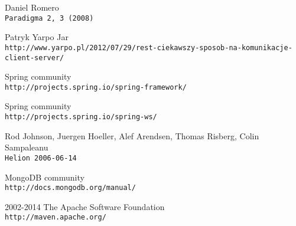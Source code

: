 \documentclass[11pt]{aghdpl}
\begin{document}
\begin{thebibliography}{1}
Daniel Romero
\newblock \\\texttt{Paradigma 2, 3 (2008)}

Patryk Yarpo Jar
\newblock \\\texttt{http://www.yarpo.pl/2012/07/29/rest-ciekawszy-sposob-na-komunikacje-client-server/}

Spring community
\newblock \\\texttt{http://projects.spring.io/spring-framework/}

Spring community
\newblock \\\texttt{http://projects.spring.io/spring-ws/}

Rod Johnson, Juergen Hoeller, Alef Arendsen, Thomas Risberg, Colin Sampaleanu
\newblock \\\texttt{Helion 2006-06-14}

MongoDB community
\newblock \\\texttt{http://docs.mongodb.org/manual/}

2002-2014 The Apache Software Foundation
\newblock \\\texttt{http://maven.apache.org/}


\end{thebibliography}
\end{document}
